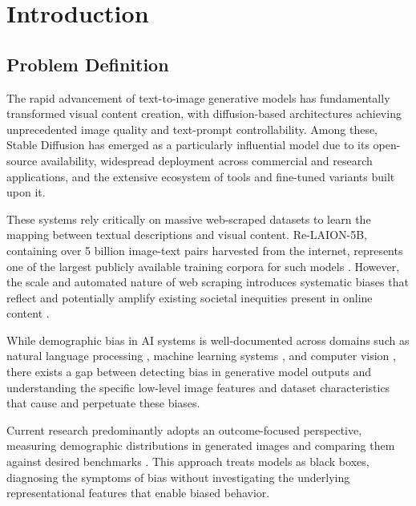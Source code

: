 \chapter{Introduction}%
\label{chp:introduction}

\section{Problem Definition}
The rapid advancement of text-to-image generative models has fundamentally transformed visual content creation, with diffusion-based architectures achieving unprecedented image quality and text-prompt controllability. Among these, Stable Diffusion \cite{Rombach_2022_CVPR} has emerged as a particularly influential model due to its open-source availability, widespread deployment across commercial and research applications, and the extensive ecosystem of tools and fine-tuned variants built upon it. 

These systems rely critically on massive web-scraped datasets to learn the mapping between textual descriptions and visual content. Re-LAION-5B, containing over 5 billion image-text pairs harvested from the internet, represents one of the largest publicly available training corpora for such models \cite{Schuhmann_2022_Laion5b}. However, the scale and automated nature of web scraping introduces systematic biases that reflect and potentially amplify existing societal inequities present in online content \cite{Birhane_2021_MultiModalDatasetsMisogynyPornography}.

While demographic bias in AI systems is well-documented across domains such as natural language processing \cite{Bolukbasi_2016_ManComputerProgrammerWoman}, machine learning systems \cite{Mehrabi_2022_SurveyBiasFairnessMachine}, and computer vision \cite{Buolamwini_2018_BiasGenderClassification}, there exists a gap between detecting bias in generative model outputs and understanding the specific low-level image features and dataset characteristics that cause and perpetuate these biases.
 
Current research predominantly adopts an outcome-focused perspective, measuring demographic distributions in generated images and comparing them against desired benchmarks \cite{Luccioni_2023_AnalyzingSocietalRepresentationsDiffusionModels, Bianchi_2023_TTIGenAmplifiesDemographicStereotypes}. This approach treats models as black boxes, diagnosing the symptoms of bias without investigating the underlying representational features that enable biased behavior.


